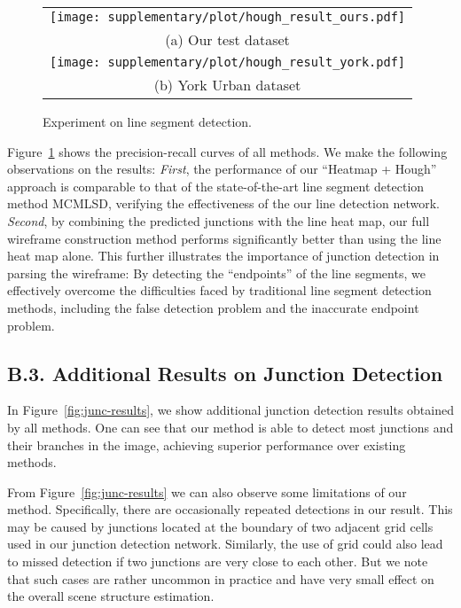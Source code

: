 \documentclass[10pt,twocolumn,letterpaper]{article}
\begin{document}
\begin{figure}[t]
	\centering
	\begin{tabular}{c}
		\texttt{[image: supplementary/plot/hough\_result\_ours.pdf]} \\
		(a) Our test dataset \\
		\texttt{[image: supplementary/plot/hough\_result\_york.pdf]} \\
		(b) York Urban dataset
	\end{tabular}
	\caption{Experiment on line segment detection.}
	\label{fig:hough}
\end{figure}

Figure~\ref{fig:hough} shows the precision-recall curves of all methods. We make the following observations on the results: {\em First}, the performance of our ``Heatmap + Hough'' approach is comparable to that of the state-of-the-art line segment detection method MCMLSD, verifying the effectiveness of the our line detection network. {\em Second}, by combining the predicted junctions with the line heat map, our full wireframe construction method performs significantly better than using the line heat map alone. This further illustrates the importance of junction detection in parsing the wireframe: By detecting the ``endpoints'' of the line segments, we effectively overcome the difficulties faced by traditional line segment detection methods, including the false detection problem and the inaccurate endpoint problem.



 
 
\subsection*{B.3. Additional Results on Junction Detection}
In Figure~\ref{fig:junc-results}, we show additional junction detection results obtained by all methods. One can see that our method is able to detect most junctions and their branches in the image, achieving superior performance over existing methods.

From Figure~\ref{fig:junc-results} we can also observe some limitations of our method. Specifically, there are occasionally repeated detections in our result. This may be caused by junctions located at the boundary of two adjacent grid cells used in our junction detection network. Similarly, the use of grid could also lead to missed detection if two junctions are very close to each other. But we note that such cases are rather uncommon in practice and have very small effect on the overall scene structure estimation.
\end{document}
